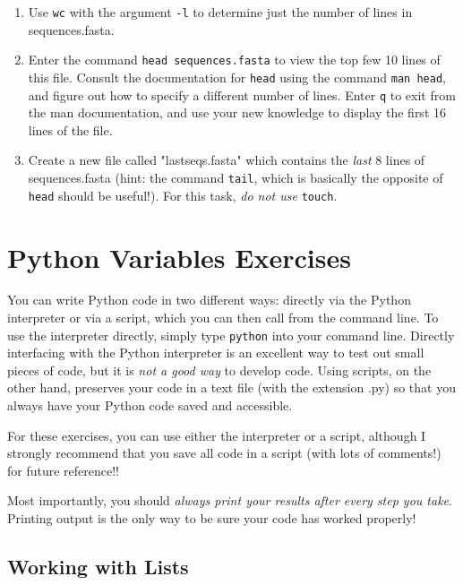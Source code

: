 \documentclass{article}[12pt]
\newcommand{\code}[1]{\texttt{#1}}  %
\begin{document}
\begin{enumerate}[itemsep=5ex]
\begin{enumerate}[itemsep=2ex]
		\item Use \code{wc} with the argument \code{-l} to determine just the number of lines in sequences.fasta.
		
		\item Enter the command \code{head sequences.fasta} to view the top few 10 lines of this file. Consult the documentation for \code{head} using the command \code{man head}, and figure out how to specify a different number of lines. Enter \code{q} to exit from the man documentation, and use your new knowledge to display the first 16 lines of the file.
		 
		\item Create a new file called "lastseqs.fasta" which contains the \emph{last} 8 lines of sequences.fasta (hint: the command \code{tail}, which is basically the opposite of \code{head} should be useful!). For this task, \emph{do not use} \code{touch}.
	\end{enumerate}
\end{enumerate}
			
\vspace{2.25cm}

\section{Python Variables Exercises}

You can write Python code in two different ways: directly via the Python interpreter or via a script, which you can then call from the command line. To use the interpreter directly, simply type \code{python} into your command line. Directly interfacing with the Python interpreter is an excellent way to test out small pieces of code, but it is \emph{not a good way} to develop code. Using scripts, on the other hand, preserves your code in a text file (with the extension .py) so that you always have your Python code saved and accessible.

For these exercises, you can use either the interpreter or a script, although I strongly recommend that you save all code in a script (with lots of comments!) for future reference!!

Most importantly, you should \emph{always print your results after every step you take}. Printing output is the only way to be sure your code has worked properly!

\vspace{1.5cm}

\subsection{Working with Lists}
\end{document}
